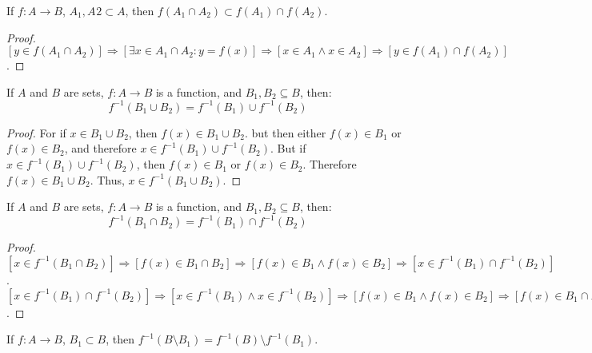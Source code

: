     \begin{theorem}
        If $f:A\rightarrow B$, $A_{1},A_{}2\subset A$, then
        $f(A_{1}\cap{A}_{2})\subset{f}(A_{1})\cap{f}(A_{2})$.
    \end{theorem}
    \begin{proof}
        $[y\in f(A_1 \cap A_2)]\Rightarrow [\exists x\in A_1 \cap A_2:y=f(x)]\Rightarrow [x\in A_1 \land x \in A_2] \Rightarrow[y \in f(A_1)\cap f(A_2)]$.
    \end{proof}
    \begin{theorem}
        If $A$ and $B$ are sets, $f:A\rightarrow{B}$ is a function,
        and $B_{1},B_{2}\subseteq{B}$, then:
        \begin{equation}
            f^{-1}(B_{1}\cup{B}_{2})=f^{-1}(B_{1})\cup{f}^{-1}(B_{2})
        \end{equation}
    \end{theorem}
    \begin{proof}
        For if $x\in{B}_{1}\cup{B}_{2}$, then
        $f(x)\in{B}_{1}\cup{B}_{2}$. but then either
        $f(x)\in{B}_{1}$ or $f(x)\in{B}_{2}$, and therefore
        $x\in{f}^{\minus{1}}(B_1)\cup{f}^{\minus{1}}(B_2)$. But if
        $x\in{f}^{\minus{1}}(B_{1})\cup{f}^{\minus{1}}(B_2)$, then
        $f(x)\in{B}_{1}$ or $f(x)\in{B}_{2}$. Therefore
        $f(x)\in{B}_{1}\cup{B}_{2}$. Thus, $x\in{f}^{-1}(B_1\cup{B}_2)$.
    \end{proof}
    \begin{theorem}
        If $A$ and $B$ are sets, $f:A\rightarrow{B}$ is a function,
        and $B_{1},B_{2}\subseteq{B}$, then:
        \begin{equation}
            f^{-1}(B_{1}\cap{B}_{2})=f^{-1}(B_{1})\cap{f}^{-1}(B_{2})
        \end{equation}
    \end{theorem}
    \begin{proof}
        $[x\in f^{-1}(B_1\cap B_2)]\Rightarrow [f(x) \in B_1 \cap B_2]\Rightarrow [f(x)\in B_1\land f(x) \in B_2 ]\Rightarrow [x\in f^{-1}(B_1)\cap f^{-1}(B_2)]$. $[x\in f^{-1}(B_1)\cap f^{-1}(B_2)]\Rightarrow [x\in f^{-1}(B_1)\land x\in f^{-1}(B_2)]\Rightarrow [f(x) \in B_1\land f(x) \in B_2]\Rightarrow [f(x)\in B_1\cap B_2]\Rightarrow [x\in f^{-1}(B_1\cap B_2)]$.
    \end{proof}
    \begin{theorem}
    If $f:A\rightarrow B$, $B_1 \subset B$, then $f^{-1}(B\setminus B_1) = f^{-1}(B)\setminus f^{-1}(B_1)$.
    \end{theorem}
